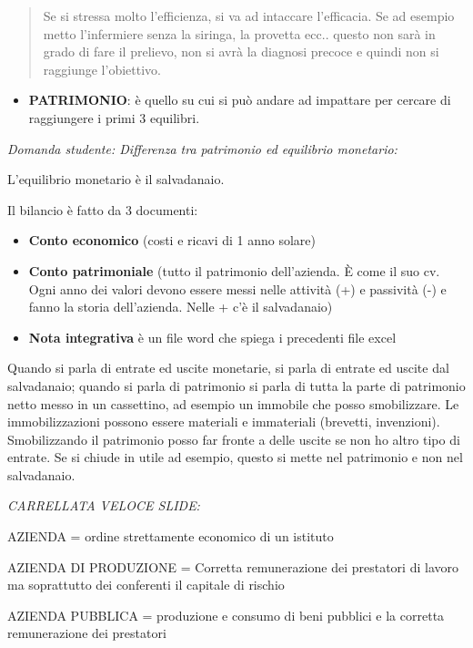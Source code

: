\documentclass[]{article}
\begin{document}
\begin{quote}
Se si stressa molto l'efficienza, si va ad intaccare l'efficacia. Se ad
esempio metto l'infermiere senza la siringa, la provetta ecc.. questo
non sarà in grado di fare il prelievo, non si avrà la diagnosi precoce e
quindi non si raggiunge l'obiettivo.
\end{quote}

\begin{itemize}
\item
  \textbf{PATRIMONIO}: è quello su cui si può andare ad impattare per
  cercare di raggiungere i primi 3 equilibri.
\end{itemize}

\emph{Domanda studente: Differenza tra patrimonio ed equilibrio
monetario:}

L'equilibrio monetario è il salvadanaio.

Il bilancio è fatto da 3 documenti:

\begin{itemize}
\item
  \textbf{Conto economico} (costi e ricavi di 1 anno solare)
\item
  \textbf{Conto patrimoniale} (tutto il patrimonio dell'azienda. È come
  il suo cv. Ogni anno dei valori devono essere messi nelle attività (+)
  e passività (-) e fanno la storia dell'azienda. Nelle + c'è il
  salvadanaio)
\item
  \textbf{Nota integrativa} è un file word che spiega i precedenti file
  excel
\end{itemize}

Quando si parla di entrate ed uscite monetarie, si parla di entrate ed
uscite dal salvadanaio; quando si parla di patrimonio si parla di tutta
la parte di patrimonio netto messo in un cassettino, ad esempio un
immobile che posso smobilizzare. Le immobilizzazioni possono essere
materiali e immateriali (brevetti, invenzioni). Smobilizzando il
patrimonio posso far fronte a delle uscite se non ho altro tipo di
entrate. Se si chiude in utile ad esempio, questo si mette nel
patrimonio e non nel salvadanaio.

\emph{CARRELLATA VELOCE SLIDE:}

AZIENDA = ordine strettamente economico di un istituto

AZIENDA DI PRODUZIONE = Corretta remunerazione dei prestatori di lavoro
ma soprattutto dei conferenti il capitale di rischio

AZIENDA PUBBLICA = produzione e consumo di beni pubblici e la corretta
remunerazione dei prestatori
\end{document}
